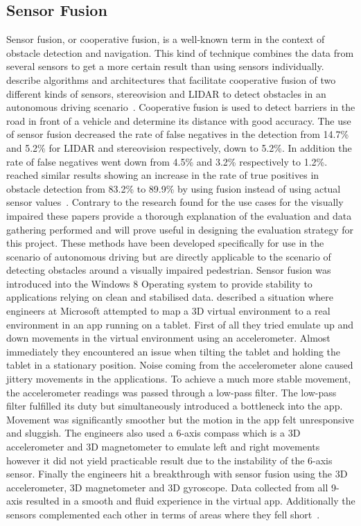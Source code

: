 \documentclass[prodmode,acmtosem]{acmsmall} %
\begin{document}
\subsection{Sensor Fusion}
Sensor fusion, or cooperative fusion, is a well-known term in the context of obstacle detection and navigation. This kind of technique combines the data from several sensors to get a more certain result than using sensors individually. \citet{Labayrade2005} describe algorithms and architectures that facilitate cooperative fusion of two different kinds of sensors, stereovision and LIDAR to detect obstacles in an autonomous driving scenario~\cite{Labayrade2005}. Cooperative fusion is used to detect barriers in the road in front of a vehicle and determine its distance with good accuracy. The use of sensor fusion decreased the rate of false negatives in the detection from 14.7\% and 5.2\% for LIDAR and stereovision respectively, down to 5.2\%. In addition the rate of false negatives went down from 4.5\% and 3.2\% respectively to 1.2\%. \citet{Cho2014} reached similar results showing an increase in the rate of true positives in obstacle detection from 83.2\% to 89.9\% by using fusion instead of using actual sensor values~\cite{Cho2014}. Contrary to the research found for the use cases for the visually impaired these papers provide a thorough explanation of the evaluation and data gathering performed and will prove useful in designing the evaluation strategy for this project. These methods have been developed specifically for use in the scenario of autonomous driving but are directly applicable to the scenario of detecting obstacles around a visually impaired pedestrian. Sensor fusion was introduced into the Windows 8 Operating system to provide stability to applications relying on clean and stabilised data. \citet{Gear2012} described a situation where engineers at Microsoft attempted to map a 3D virtual environment to a real environment in an app running on a tablet. First of all they tried emulate up and down movements in the virtual environment using an accelerometer. Almost immediately they encountered an issue when tilting the tablet and holding the tablet in a stationary position. Noise coming from the accelerometer alone caused jittery movements in the applications. To achieve a much more stable movement, the accelerometer readings was passed through a low-pass filter. The low-pass filter fulfilled its duty but simultaneously introduced a bottleneck into the app. Movement was significantly smoother but the motion in the app felt unresponsive and sluggish. The engineers also used a 6-axis compass which is a 3D accelerometer and 3D magnetometer to emulate left and right movements however it did not yield practicable result due to the instability of the 6-axis sensor. Finally the engineers hit a breakthrough with sensor fusion using the 3D accelerometer, 3D magnetometer and 3D gyroscope. Data collected from all 9-axis resulted in a smooth and fluid experience in the virtual app. Additionally the sensors complemented each other in terms of areas where they fell short~\cite{Gear2012}.
\end{document}
